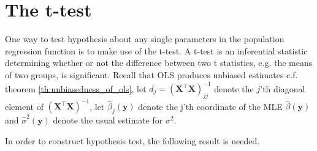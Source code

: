 \section{The t-test}
One way to test hypothesis about any single parameters in the population regression function is to make use of the t-test. 
A t-test is an inferential statistic determining whether or not the difference between two t statistics, e.g. the means of two groups, is significant. 
Recall that OLS produces unbiased estimates c.f. theorem \ref{th:unbiasedness_of_ols}, let $d_j=(\textbf{X}^\top\textbf{X})^{-1}_{jj}$ denote the $j$'th diagonal element of $(\textbf{X}^\top \textbf{X})^{-1}$, let $\hat{\beta}_j(\textbf{y})$ denote the j'th coordinate of the MLE $\hat{\beta}(\textbf{y})$ and $\hat{\sigma}^2(\textbf{y})$ denote the usual estimate for $\sigma^2$.

In order to construct hypothesis test, the following result is needed.

